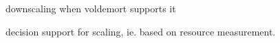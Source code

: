 
downscaling when voldemort supports it

decision support for scaling, ie. based on resource measurement.
